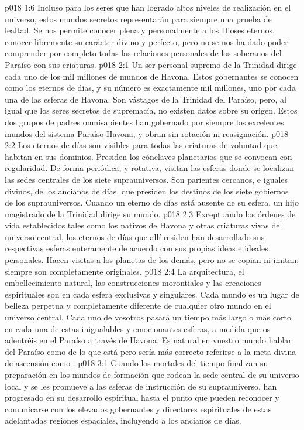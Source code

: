 \vs p018 1:6 Incluso para los seres que han logrado altos niveles de realización en el universo, estos mundos secretos representarán para siempre una prueba de lealtad. Se nos permite conocer plena y personalmente a los Dioses eternos, conocer libremente su carácter divino y perfecto, pero no se nos ha dado poder comprender por completo todas las relaciones personales de los soberanos del Paraíso con sus criaturas.
\vs p018 2:1 Un ser personal supremo de la Trinidad dirige cada uno de los mil millones de mundos de Havona. Estos gobernantes se conocen como los eternos de días, y su número es exactamente mil millones, uno por cada una de las esferas de Havona. Son vástagos de la Trinidad del Paraíso, pero, al igual que los seres secretos de supremacía, no existen datos sobre su origen. Estos dos grupos de padres omnisapientes han gobernado por siempre los excelentes mundos del sistema Paraíso\hyp{}Havona, y obran sin rotación ni reasignación.
\vs p018 2:2 Los eternos de días son visibles para todas las criaturas de voluntad que habitan en sus dominios. Presiden los cónclaves planetarios que se convocan con regularidad. De forma periódica, y rotativa, visitan las esferas donde se localizan las sedes centrales de los siete suprauniversos. Son parientes cercanos, e iguales divinos, de los ancianos de días, que presiden los destinos de los siete gobiernos de los suprauniversos. Cuando un eterno de días está ausente de su esfera, un hijo magistrado de la Trinidad dirige su mundo.
\vs p018 2:3 Exceptuando los órdenes de vida establecidos tales como los nativos de Havona y otras criaturas vivas del universo central, los eternos de días que allí residen han desarrollado sus respectivas esferas enteramente de acuerdo con sus propias ideas e ideales personales. Hacen visitas a los planetas de los demás, pero no se copian ni imitan; siempre son completamente originales.
\vs p018 2:4 La arquitectura, el embellecimiento natural, las construcciones morontiales y las creaciones espirituales son en cada esfera exclusivas y singulares. Cada mundo es un lugar de belleza perpetua y completamente diferente de cualquier otro mundo en el universo central. Cada uno de vosotros pasará un tiempo más largo o más corto en cada una de estas inigualables y emocionantes esferas, a medida que os adentréis en el Paraíso a través de Havona. Es natural en vuestro mundo hablar del Paraíso como de lo que está  pero sería más correcto referirse a la meta divina de ascensión como .
\vs p018 3:1 Cuando los mortales del tiempo finalizan su preparación en los mundos de formación que rodean la sede central de su universo local y se les promueve a las esferas de instrucción de su suprauniverso, han progresado en su desarrollo espiritual hasta el punto que pueden reconocer y comunicarse con los elevados gobernantes y directores espirituales de estas adelantadas regiones espaciales, incluyendo a los ancianos de días.

